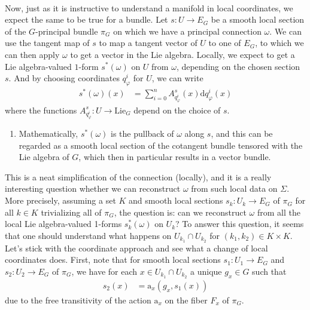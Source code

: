 \begin{enumerate}
\\
Now, just as it is instructive to understand a manifold in local coordinates, we expect the same to be true for a bundle.
Let $s \colon U \rightarrow E_{G}$ be a smooth local section of the $G$-principal bundle $\pi_{G}$ on which we have a principal connection $\omega$.
We can use the tangent map of $s$ to map a tangent vector of $U$ to one of $E_{G}$, to which we can then apply $\omega$ to get a vector in the Lie algebra.
Locally, we expect to get a Lie algebra-valued $1$-form $s^{\ast}(\omega)$ on $U$ from $\omega$, depending on the chosen section $s$.
And by choosing coordinates $q_{\varphi}^{i}$ for $U$, we can write
\begin{align*}
  s^{\ast}(\omega)(x)
  &=
  \sum_{i=0}^{n}
  A_{q_{\varphi}^{i}}^{s}(x)
  \mathrm{d}q_{\varphi}^{i}(x)
\end{align*}
where the functions $A_{q_{\varphi}^{i}}^{s} \colon U \rightarrow \mathrm{Lie}_{G}$ depend on the choice of $s$.
\begin{enumerate}
\item[$\pmb{\hookrightarrow}$]
Mathematically, $s^{\ast}(\omega)$ is the pullback of $\omega$ along $s$, and this can be regarded as a smooth local section of the cotangent bundle tensored with the Lie algebra of $G$, which then in particular results in a vector bundle.
\end{enumerate}
This is a neat simplification of the connection (locally), and it is a really interesting question whether we can reconstruct $\omega$ from such local data on $\Sigma$.
More precisely, assuming a set $K$ and smooth local sections $s_{k} \colon U_{k} \rightarrow E_{G}$ of $\pi_{G}$ for all $k \in K$ trivializing all of $\pi_{G}$, the question is: can we reconstruct $\omega$ from all the local Lie algebra-valued 1-forms $s_{k}^{\ast}(\omega)$ on $U_{k}$?
To answer this question, it seems that one should understand what happens on $U_{k_{1}} \cap U_{k_{2}}$ for $(k_{1},k_{2}) \in K \times K$.
Let's stick with the coordinate approach and see what a change of local coordinates does.
First, note that for smooth local sections $s_{1} \colon U_{1} \rightarrow E_{G}$ and $s_{2} \colon U_{2} \rightarrow E_{G}$ of $\pi_{G}$, we have for each $x \in U_{k_{1}} \cap U_{k_{2}}$ a unique $g_{x} \in G$ such that
\begin{align*}
  s_{2}(x)
  &=
  \mathrm{a}_{x}
  \left(
    g_{x},
    s_{1}(x)
  \right)
\end{align*}
due to the free transitivity of the action $\mathrm{a}_{x}$ on the fiber $F_{x}$ of $\pi_{G}$.

\end{enumerate}
